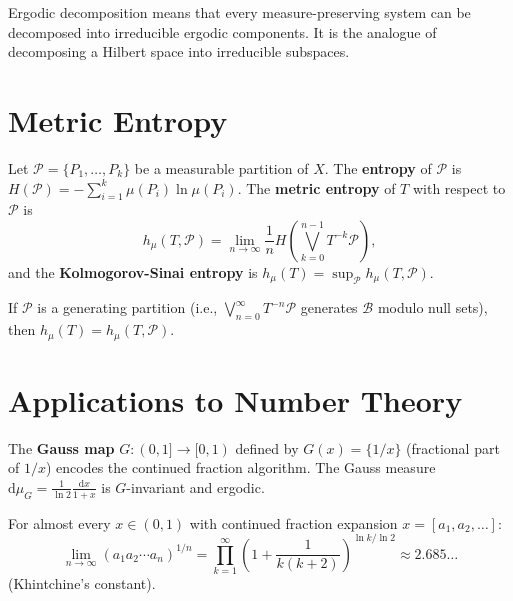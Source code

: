 \begin{remark}
Ergodic decomposition means that every measure-preserving system can be
decomposed into irreducible ergodic components. It is the analogue of
decomposing a Hilbert space into irreducible subspaces.
\end{remark}

\section{Metric Entropy}

\begin{definition}
Let $\mathcal{P} = \{P_1, \ldots, P_k\}$ be a measurable partition of $X$.
The \textbf{entropy} of $\mathcal{P}$ is
$H(\mathcal{P}) = -\sum_{i=1}^k \mu(P_i)\ln\mu(P_i)$. The
\textbf{metric entropy} of $T$ with respect to $\mathcal{P}$ is
\[
    h_\mu(T, \mathcal{P}) = \lim_{n \to \infty} \frac{1}{n}
    H\!\left(\bigvee_{k=0}^{n-1} T^{-k}\mathcal{P}\right),
\]
and the \textbf{Kolmogorov-Sinai entropy} is
$h_\mu(T) = \sup_{\mathcal{P}} h_\mu(T, \mathcal{P})$.
\end{definition}

\begin{theorem}
If $\mathcal{P}$ is a generating partition (i.e.,
$\bigvee_{n=0}^{\infty} T^{-n}\mathcal{P}$ generates $\mathcal{B}$ modulo
null sets), then $h_\mu(T) = h_\mu(T, \mathcal{P})$.
\end{theorem}

\section{Applications to Number Theory}

\begin{example}
The \textbf{Gauss map} $G : (0,1] \to [0,1)$ defined by $G(x) = \{1/x\}$
(fractional part of $1/x$) encodes the continued fraction algorithm. The
Gauss measure $\mathrm{d}\mu_G = \frac{1}{\ln 2}\frac{\mathrm{d}x}{1+x}$
is $G$-invariant and ergodic.
\end{example}

\begin{corollary}
For almost every $x \in (0,1)$ with continued fraction expansion
$x = [a_1, a_2, \ldots]$:
\[
    \lim_{n \to \infty} (a_1 a_2 \cdots a_n)^{1/n}
    = \prod_{k=1}^{\infty}
    \left(1 + \frac{1}{k(k+2)}\right)^{\ln k/\ln 2}
    \approx 2.685\ldots
\]
(Khintchine's constant).
\end{corollary}

